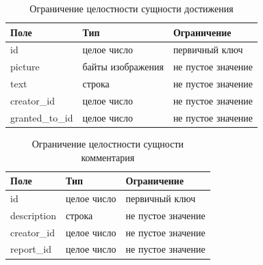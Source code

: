 \begin{table}[H]
	\centering
	\caption{Ограничение целостности сущности достижения}
	\begin{tabularx}{\textwidth}{|X|X|X|}
		\hline
		Поле & Тип & Ограничение \\
		\hline
		id & целое число & первичный ключ\\
		\hline
		picture & байты изображения &  не пустое значение\\
		\hline
		text & строка & не пустое значение\\
		\hline
		creator\_id & целое число & не пустое значение\\
		\hline
		granted\_to\_id & целое число & не пустое значение \\
		\hline
	\end{tabularx}
	\label{t:achievment_cons}
\end{table}

\begin{table}[H]
	\centering
	\caption{Ограничение целостности сущности комментария}
	\begin{tabularx}{\textwidth}{|X|X|X|}
		\hline
		Поле & Тип & Ограничение \\
		\hline
		id & целое число & первичный ключ\\
		\hline
		description & строка & не пустое значение\\
		\hline
		creator\_id & целое число & не пустое значение\\
		\hline
		report\_id & целое число & не пустое значение\\
		\hline
	\end{tabularx}
	\label{t:comment_cons}
\end{table}






